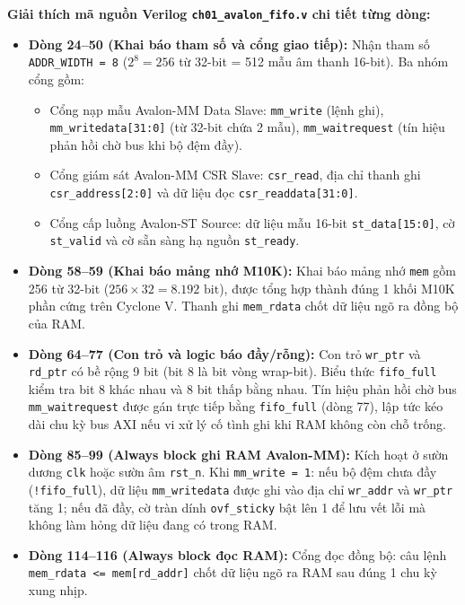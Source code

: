 \textbf{Giải thích mã nguồn Verilog \texttt{ch01\_avalon\_fifo.v} chi tiết từng dòng:}
\begin{itemize}[leftmargin=1.5em, itemsep=2pt]
    \item \textbf{Dòng 24--50 (Khai báo tham số và cổng giao tiếp):} Nhận tham số \texttt{ADDR\_WIDTH = 8} ($2^8 = 256$ từ 32-bit = 512 mẫu âm thanh 16-bit). Ba nhóm cổng gồm:
    \begin{itemize}[leftmargin=1.2em, itemsep=1pt]
        \item Cổng nạp mẫu Avalon-MM Data Slave: \texttt{mm\_write} (lệnh ghi), \texttt{mm\_writedata[31:0]} (từ 32-bit chứa 2 mẫu), \texttt{mm\_waitrequest} (tín hiệu phản hồi chờ bus khi bộ đệm đầy).
        \item Cổng giám sát Avalon-MM CSR Slave: \texttt{csr\_read}, địa chỉ thanh ghi \texttt{csr\_address[2:0]} và dữ liệu đọc \texttt{csr\_readdata[31:0]}.
        \item Cổng cấp luồng Avalon-ST Source: dữ liệu mẫu 16-bit \texttt{st\_data[15:0]}, cờ \texttt{st\_valid} và cờ sẵn sàng hạ nguồn \texttt{st\_ready}.
    \end{itemize}
    \item \textbf{Dòng 58--59 (Khai báo mảng nhớ M10K):} Khai báo mảng nhớ \texttt{mem} gồm 256 từ 32-bit ($256 \times 32 = 8.192\text{ bit}$), được tổng hợp thành đúng 1 khối M10K phần cứng trên Cyclone V. Thanh ghi \texttt{mem\_rdata} chốt dữ liệu ngõ ra đồng bộ của RAM.
    \item \textbf{Dòng 64--77 (Con trỏ và logic báo đầy/rỗng):} Con trỏ \texttt{wr\_ptr} và \texttt{rd\_ptr} có bề rộng 9 bit (bit 8 là bit vòng wrap-bit). Biểu thức \texttt{fifo\_full} kiểm tra bit 8 khác nhau và 8 bit thấp bằng nhau. Tín hiệu phản hồi chờ bus \texttt{mm\_waitrequest} được gán trực tiếp bằng \texttt{fifo\_full} (dòng 77), lập tức kéo dài chu kỳ bus AXI nếu vi xử lý cố tình ghi khi RAM không còn chỗ trống.
    \item \textbf{Dòng 85--99 (Always block ghi RAM Avalon-MM):} Kích hoạt ở sườn dương \texttt{clk} hoặc sườn âm \texttt{rst\_n}. Khi \texttt{mm\_write = 1}: nếu bộ đệm chưa đầy (\texttt{!fifo\_full}), dữ liệu \texttt{mm\_writedata} được ghi vào địa chỉ \texttt{wr\_addr} và \texttt{wr\_ptr} tăng 1; nếu đã đầy, cờ tràn dính \texttt{ovf\_sticky} bật lên 1 để lưu vết lỗi mà không làm hỏng dữ liệu đang có trong RAM.
    \item \textbf{Dòng 114--116 (Always block đọc RAM):} Cổng đọc đồng bộ: câu lệnh \texttt{mem\_rdata <= mem[rd\_addr]} chốt dữ liệu ngõ ra RAM sau đúng 1 chu kỳ xung nhịp.

\end{itemize}
